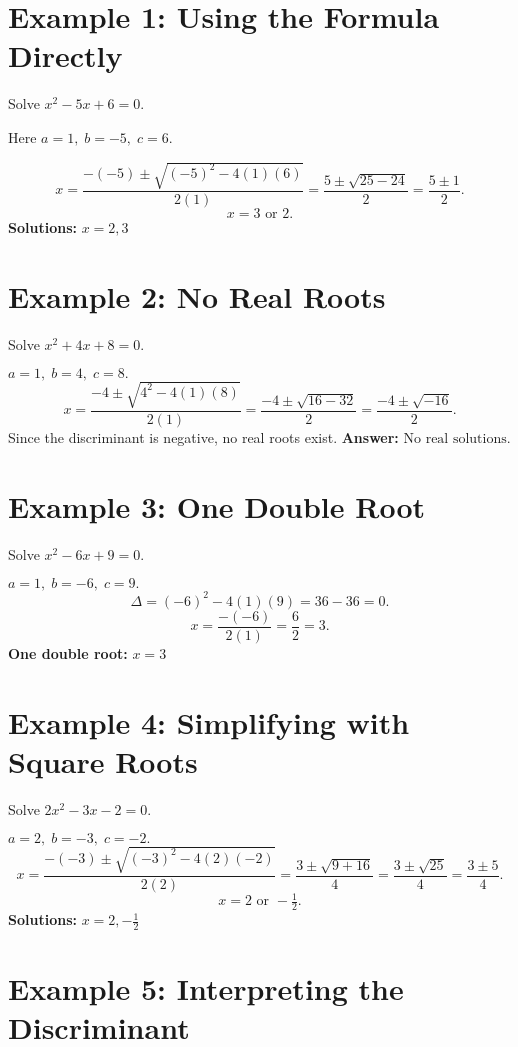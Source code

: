 \documentclass[12pt]{article}
\begin{document}
\section*{Example 1: Using the Formula Directly}

Solve \(x^2 - 5x + 6 = 0.\)

Here \(a = 1,\; b = -5,\; c = 6.\)

\[
x = \frac{-(-5) \pm \sqrt{(-5)^2 - 4(1)(6)}}{2(1)} 
= \frac{5 \pm \sqrt{25 - 24}}{2} 
= \frac{5 \pm 1}{2}.
\]
\[
x = 3 \text{ or } 2.
\]
\textbf{Solutions:} \(\boxed{x = 2, 3}\)

\section*{Example 2: No Real Roots}

Solve \(x^2 + 4x + 8 = 0.\)

\(a = 1,\; b = 4,\; c = 8.\)
\[
x = \frac{-4 \pm \sqrt{4^2 - 4(1)(8)}}{2(1)} 
= \frac{-4 \pm \sqrt{16 - 32}}{2} 
= \frac{-4 \pm \sqrt{-16}}{2}.
\]
Since the discriminant is negative, no real roots exist.  
\textbf{Answer:} \(\boxed{\text{No real solutions.}}\)

\section*{Example 3: One Double Root}

Solve \(x^2 - 6x + 9 = 0.\)

\(a = 1,\; b = -6,\; c = 9.\)
\[
\Delta = (-6)^2 - 4(1)(9) = 36 - 36 = 0.
\]
\[
x = \frac{-(-6)}{2(1)} = \frac{6}{2} = 3.
\]
\textbf{One double root:} \(\boxed{x = 3}\)

\section*{Example 4: Simplifying with Square Roots}

Solve \(2x^2 - 3x - 2 = 0.\)

\(a = 2,\; b = -3,\; c = -2.\)
\[
x = \frac{-(-3) \pm \sqrt{(-3)^2 - 4(2)(-2)}}{2(2)} 
= \frac{3 \pm \sqrt{9 + 16}}{4}
= \frac{3 \pm \sqrt{25}}{4}
= \frac{3 \pm 5}{4}.
\]
\[
x = 2 \text{ or } -\tfrac{1}{2}.
\]
\textbf{Solutions:} \(\boxed{x = 2, -\tfrac{1}{2}}\)

\section*{Example 5: Interpreting the Discriminant}
\end{document}
